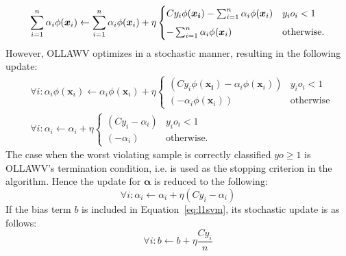 \documentclass[reqno]{vcuthesis}
\numberwithin{equation}{chapter}
\begin{document}
\begin{equation*}
\centering
\sum_{i=1}^n \alpha_i \phi(\bm x_i) \leftarrow \sum_{i=1}^n \alpha_i \phi(\bm x_i) + \eta \begin{cases} 
															C y_i \phi(\bm{x_i}) - \sum_{i=1}^n \alpha_i \phi(\bm x_i) & y_i o_i < 1 \\[5pt]
															-\sum_{i=1}^n \alpha_i \phi(\bm x_i) & \text{otherwise}.
													 \end{cases}
\end{equation*}
However, OLLAWV optimizes in a stochastic manner, resulting in the following update:
\begin{align*}
&\forall i: \alpha_i \phi(\bm x_i) \leftarrow \alpha_i \phi(\bm x_i) + \eta \begin{cases} 
																													(Cy_i\phi(\bm{x_i}) - \alpha_i \phi(\bm x_i)) & y_i o_i < 1 \\
																													(- \alpha_i \phi(\bm x_i)) & \text{otherwise}
																													 \end{cases} \\							
&\forall i: \alpha_i \leftarrow \alpha_i + \eta \begin{cases} 
																(Cy_i - \alpha_i) & y_i o_i < 1 \\
																(- \alpha_i) & \text{otherwise}.
															\end{cases} 
\end{align*}
The case when the worst violating sample is correctly classified $yo \geq 1$ is OLLAWV's termination condition, i.e. is used as the stopping criterion in the algorithm. Hence the update for $\bm \alpha$ is reduced to the following:
\begin{equation}
\label{eq:alphaupdate}
\forall i: \alpha_i \leftarrow \alpha_i + \eta(Cy_i - \alpha_i)
\end{equation}
If the bias term $b$ is included in Equation~\ref{eq:l1svm}, its stochastic update is as follows:
\begin{equation}
\label{eq:upbias}
\forall i: b \leftarrow b + \eta \frac{C y_i}{n}
\end{equation}
\end{document}
